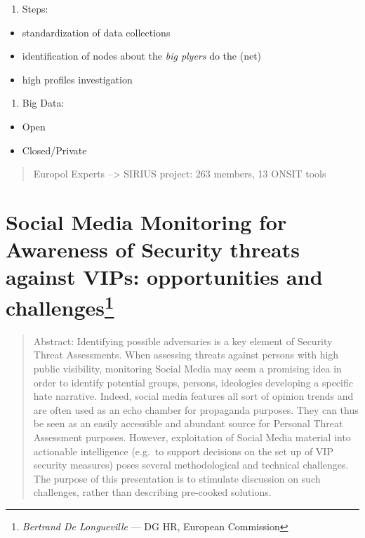 \documentclass[]{book}
\providecommand{\tightlist}{%
  \setlength{\itemsep}{0pt}\setlength{\parskip}{0pt}}
\let\rmarkdownfootnote\footnote%
\def\footnote{\protect\rmarkdownfootnote}
\theoremstyle{definition}
\theoremstyle{definition}
\theoremstyle{definition}
\theoremstyle{remark}
\begin{document}
\begin{enumerate}
\def\labelenumi{\arabic{enumi}.}
\setcounter{enumi}{2}
\tightlist
\item
  Steps:
\end{enumerate}

\begin{itemize}
\tightlist
\item
  standardization of data collections
\item
  identification of nodes about the \emph{big plyers} do the (net)
\item
  high profiles investigation
\end{itemize}

\begin{enumerate}
\def\labelenumi{\arabic{enumi}.}
\setcounter{enumi}{3}
\tightlist
\item
  Big Data:
\end{enumerate}

\begin{itemize}
\tightlist
\item
  Open
\item
  Closed/Private
\end{itemize}

\begin{quote}
Europol Experts --\textgreater{} SIRIUS project: 263 members, 13 ONSIT
tools
\end{quote}

\section[Social Media Monitoring for Awareness of Security threats
against VIPs: opportunities and challenges]{\texorpdfstring{Social Media
Monitoring for Awareness of Security threats against VIPs: opportunities
and challenges\footnote{\emph{Bertrand De Longueville} --- DG HR,
  European Commission}}{Social Media Monitoring for Awareness of Security threats against VIPs: opportunities and challenges}}\label{social-media-monitoring-for-awareness-of-security-threats-against-vips-opportunities-and-challenges}

\begin{quote}
Abstract: Identifying possible adversaries is a key element of Security
Threat Assessments. When assessing threats against persons with high
public visibility, monitoring Social Media may seem a promising idea in
order to identify potential groups, persons, ideologies developing a
specific hate narrative. Indeed, social media features all sort of
opinion trends and are often used as an echo chamber for propaganda
purposes. They can thus be seen as an easily accessible and abundant
source for Personal Threat Assessment purposes. However, exploitation of
Social Media material into actionable intelligence (e.g.~to support
decisions on the set up of VIP security measures) poses several
methodological and technical challenges. The purpose of this
presentation is to stimulate discussion on such challenges, rather than
describing pre-cooked solutions.
\end{quote}
\end{document}
